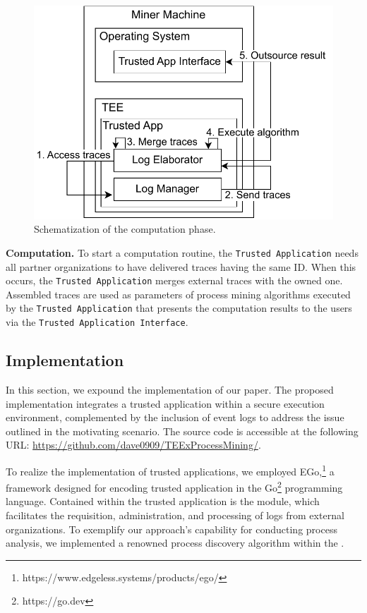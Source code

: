 \begin{figure}
   \vspace{-2em}
  \centering
  \includegraphics[width=1\textwidth]{content/figures/computationworkflow.pdf}
  \caption[A gull]{Schematization of the computation phase.}
  \vspace{-6pt}
\end{figure}
\textbf{Computation.} To start a computation routine, the \texttt{Trusted Application} needs all partner organizations to have delivered traces having the same ID. When this occurs, the \texttt{Trusted Application} merges external traces with the owned one. Assembled traces are used as parameters of process mining algorithms executed by the \texttt{Trusted Application} that presents the computation results to the users via the \texttt{Trusted Application Interface}.







\subsection{Implementation}
\label{sec:implementation:details}
In this section, we expound the implementation of our paper. The proposed implementation integrates a trusted application within a secure execution environment, complemented by the inclusion of event logs to address the issue outlined in the motivating scenario. The source code is accessible at the following URL: \url{https://github.com/dave0909/TEExProcessMining/}.


To realize the implementation of trusted applications, we employed EGo,\footnote{https://www.edgeless.systems/products/ego/} a framework designed for encoding trusted application in the Go\footnote{https://go.dev} programming language. Contained within the trusted application is the  module, which facilitates the requisition, administration, and processing of logs from external organizations. To exemplify our approach's capability for conducting process analysis, we implemented a renowned process discovery algorithm within the . 










